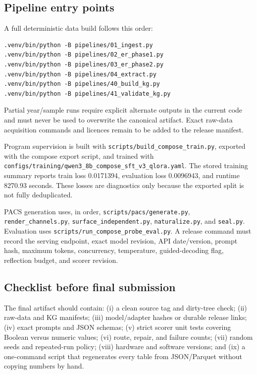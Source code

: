 \subsection{Pipeline entry points}

A full deterministic data build follows this order:
\begin{verbatim}
.venv/bin/python -B pipelines/01_ingest.py
.venv/bin/python -B pipelines/02_er_phase1.py
.venv/bin/python -B pipelines/03_er_phase2.py
.venv/bin/python -B pipelines/04_extract.py
.venv/bin/python -B pipelines/40_build_kg.py
.venv/bin/python -B pipelines/41_validate_kg.py
\end{verbatim}
Partial year/sample runs require explicit alternate outputs in the current code and must never
be used to overwrite the canonical artifact.  Exact raw-data acquisition commands and licences
remain to be added to the release manifest.

Program supervision is built with \texttt{scripts/build\_compose\_train.py}, exported with the
compose export script, and trained with
\texttt{configs/training/qwen3\_8b\_compose\_sft\_v3\_qlora.yaml}.  The stored training summary
reports train loss 0.0171394, evaluation loss 0.0096943, and runtime 8270.93 seconds.  These losses
are diagnostics only because the exported split is not fully deduplicated.

PACS generation uses, in order,
\texttt{scripts/pacs/generate.py}, \texttt{render\_channels.py},
\texttt{surface\_independent.py}, \texttt{naturalize.py}, and \texttt{seal.py}.  Evaluation uses
\texttt{scripts/run\_compose\_probe\_eval.py}.  A release command must record the serving
endpoint, exact model revision, API date/version, prompt hash, maximum tokens, concurrency,
temperature, guided-decoding flag, reflection budget, and scorer revision.

\subsection{Checklist before final submission}

The final artifact should contain: (i) a clean source tag and dirty-tree check; (ii) raw-data and
KG manifests; (iii) model/adapter hashes or durable release links; (iv) exact prompts and JSON
schemas; (v) strict scorer unit tests covering Boolean versus numeric values; (vi) route,
repair, and failure counts; (vii) random seeds and repeated-run policy; (viii) hardware and
software versions; and (ix) a one-command script that regenerates every table from JSON/Parquet
without copying numbers by hand.

